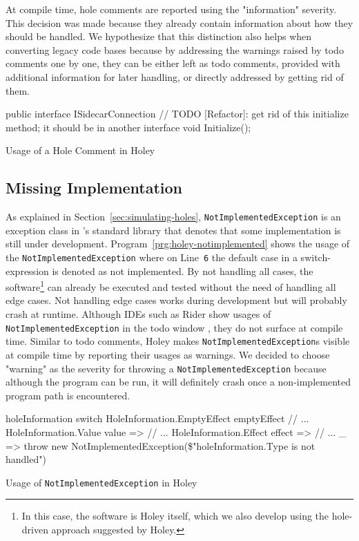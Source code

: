 At compile time, hole comments are reported using the "information" severity.
This decision was made because they already contain information about how they should be handled.
We hypothesize that this distinction also helps when converting legacy code bases because by addressing the warnings raised by todo comments one by one, they can be either left as todo comments, provided with additional information for later handling, or directly addressed by getting rid of them.

\begin{program}[ht]
\begin{CsCode}
public interface ISidecarConnection
{
	// TODO [Refactor]: get rid of this initialize method; it should be in another interface
	void Initialize();
}
\end{CsCode}
\caption{Usage of a Hole Comment in Holey}
\label{prg:holey-hole-comment}
\end{program}

\subsection{Missing Implementation}
As explained in Section~\ref{sec:simulating-holes}, \texttt{NotImplementedException} is an exception class in \CS's standard library that denotes that some implementation is still under development.
Program~\ref{prg:holey-notimplemented} shows the usage of the \texttt{NotImplementedException} where on Line~\verb|6| the default case in a switch-expression is denoted as not implemented.
By not handling all cases, the software\footnote{In this case, the software is Holey itself, which we also develop using the hole-driven approach suggested by Holey.} can already be executed and tested without the need of handling all edge cases.
Not handling edge cases works during development but will probably crash at runtime.
Although IDEs such as Rider show usages of \texttt{NotImplementedException} in the todo window \cite{jetbrains_todo_2023}, they do not surface at compile time.
Similar to todo comments, Holey makes \texttt{NotImplementedException}s visible at compile time by reporting their usages as warnings.
We decided to choose "warning" as the severity for throwing a \texttt{NotImplementedException} because although the program can be run, it will definitely crash once a non-implemented program path is encountered.

\begin{program}[ht]
\begin{CsCode}
holeInformation switch
{
	HoleInformation.EmptyEffect emptyEffect // ...
	HoleInformation.Value value => // ...
	HoleInformation.Effect effect => // ...
	_ => throw new NotImplementedException(\$"{holeInformation.Type} is not handled")
}
\end{CsCode}
\caption{Usage of \texttt{NotImplementedException} in Holey}
\label{prg:holey-notimplemented}
\end{program}

